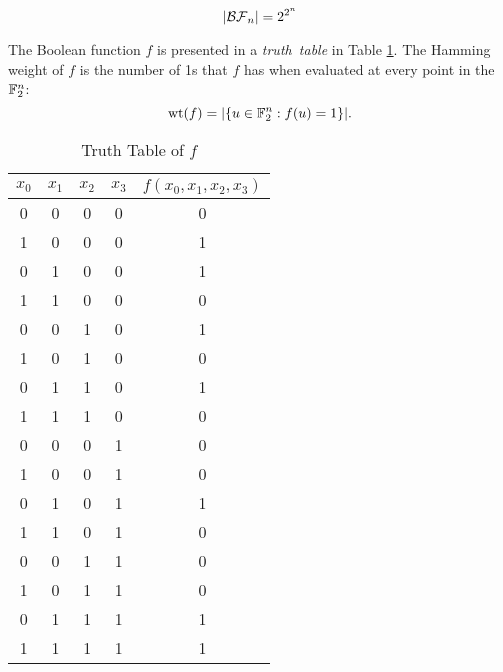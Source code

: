 \begin{equation}
  \lvert\mathcal{BF}_n\rvert = 2^{2^n}
\end{equation}

\par The Boolean function $f$ is presented in a {\em truth\ table} in 
Table \ref{tab:truth-table}. The Hamming weight of $f$ is the number of 1s
that $f$ has when evaluated at every point in the $\mathbb{F}_2^n$: 
\[
{\rm wt}(f)=\lvert\{u\in\mathbb{F}_2^n:f(u)=1\}\rvert.
\]
\begin{table}
  \centering
  \begin{tabular}{|c|c|c|c||c|}
    \hline
    $x_0$&$x_1$&$x_2$&$x_3$&$f(x_0,x_1,x_2,x_3)$\\
    \hline
    0&0&0&0&0\\
    1&0&0&0&1\\
    0&1&0&0&1\\
    1&1&0&0&0\\
    0&0&1&0&1\\
    1&0&1&0&0\\
    0&1&1&0&1\\
    1&1&1&0&0\\
    0&0&0&1&0\\
    1&0&0&1&0\\
    0&1&0&1&1\\
    1&1&0&1&0\\
    0&0&1&1&0\\
    1&0&1&1&0\\
    0&1&1&1&1\\
    1&1&1&1&1\\
    \hline
  \end{tabular}
  \caption{Truth Table of $f$}
  \label{tab:truth-table}
\end{table}

